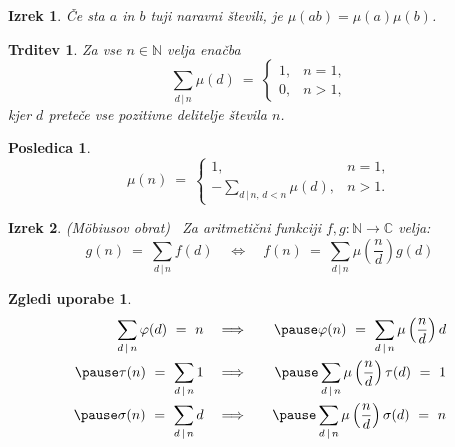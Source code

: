 \documentclass{beamer}
\def\N{\mathbb{N}} %
\def\C{\mathbb{C}} %
\newtheorem{izrek}{Izrek}
\newtheorem{trditev}{Trditev}
\newtheorem{posledica}{Posledica}
\newtheorem{zgledi}{Zgledi uporabe}
\begin{document}

\begin{frame}

\bigskip

\begin{izrek}
Če sta $a$ in $b$ tuji naravni števili, je
$\mu(a b) = \mu(a)\mu(b)$.
\end{izrek}

\pause

\bigskip
\begin{trditev}
Za vse $n \in \N$ velja enačba
\[
\label{mirek}
\sum_{d\,|\,n} \mu(d)\ =\ \left\{
\begin{array}{ll}
1, & n = 1, \\
0, & n > 1,
\end{array}
\right.
\]
kjer $d$ preteče vse pozitivne delitelje števila $n$.
\end{trditev}

\pause

\bigskip
\begin{posledica}
\[
\mu(n)\ =\ \left\{
\begin{array}{cl}
1, & n = 1, \\
-\displaystyle\sum_{d\,|\,n, \,d < n} \mu(d), & n > 1.
\end{array}
\right.
\]
\end{posledica}

\end{frame}


\begin{frame}

\begin{izrek} \alert{(M\"obiusov obrat)} \ 
Za aritmetični funkciji $f, g: \N \rightarrow \C$ velja:
\[
g(n)\ =\ \sum_{d\,|\,n} f(d)\quad \Longleftrightarrow\quad f(n)\ =\ \sum_{d\,|\,n} \mu\left(\frac{n}{d}\right)g(d)
\]
\end{izrek}

\pause
\bigskip
\begin{zgledi}
\begin{eqnarray*}
\sum_{d\,|\,n}\varphi(d)\ =\ n\quad &\Longrightarrow&\quad\pause \varphi(n)\ =\ \sum_{d\,|\,n}\mu\left(\frac{n}{d}\right)d \\
\pause
\tau(n)\ =\ \sum_{d\,|\,n} 1 \quad &\Longrightarrow& \quad\pause \sum_{d\,|\,n}\mu\left(\frac{n}{d}\right)\tau(d)\ =\ 1 \\
\pause
\sigma(n)\ =\ \sum_{d\,|\,n} d \quad &\Longrightarrow& \quad\pause \sum_{d\,|\,n}\mu\left(\frac{n}{d}\right)\sigma(d)\ =\ n
\end{eqnarray*}
\end{zgledi}


\end{frame}
\end{document}
